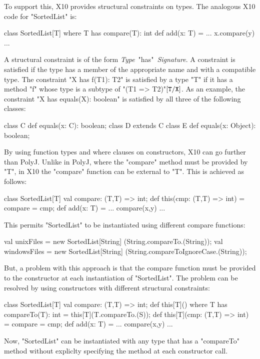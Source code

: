 \documentclass[preprint,nocopyrightspace,9pt]{sigplanconf}
\begin{document}
To support this, X10 provides structural constraints on types.
The analogous X10 code for \xcd"SortedList" is:
\begin{xten}
class SortedList[T] where T has compare(T): int {
    def add(x: T) = { ... x.compare(y) ... }
}
\end{xten}

A structural constraint is of the form \emph{Type}~\xcd"has"~\emph{Signature}.
A constraint is satisfied if the type has a member of the appropriate name
and with a compatible type.
The constraint \xcd"X has f(T1): T2"
is satisfied by a type \xcd"T" if it has a method \xcd"f"
whose type is a subtype of \xcd"(T1 => T2)"$[{\tt T}/{\tt X}]$.
As an example,
the constraint \xcd"X has equals(X): boolean"
is satisfied by all three of the following classes:
\begin{xten}
class C { def equals(x: C): boolean; }
class D extends C { }
class E { def equals(x: Object): boolean; }
\end{xten}

By using function types and where clauses on constructors,
X10 can go further than PolyJ.
Unlike in PolyJ, where the \xcd"compare" method must be provided by \xcd"T",
in X10 the \xcd"compare" function can be external to \xcd"T".
This is achieved as follows:
\begin{xten}
class SortedList[T] {
    val compare: (T,T) => int;
    def this(cmp: (T,T) => int) = { compare = cmp; }
    def add(x: T) = { ... compare(x,y) ... }
}
\end{xten}

This permits
\xcd"SortedList" to be instantiated using different compare functions:
\begin{xten}
val unixFiles    = new SortedList[String]
                        (String.compareTo.(String));
val windowsFiles = new SortedList[String]
                        (String.compareToIgnoreCase.(String));
\end{xten}

But, a problem with this approach is that the compare function must be
provided to the constructor at each instantiation of \xcd"SortedList".
The problem can be resolved by using constructors with different
structural constraints:
\begin{xten}
class SortedList[T] {
    val compare: (T,T) => int;
    def this[T]() where T has compareTo(T): int = {
        this[T](T.compareTo.(S));
    }
    def this[T](cmp: (T,T) => int) = { compare = cmp; }
    def add(x: T) = { ... compare(x,y) ... }
}
\end{xten}
Now, \xcd"SortedList" can be instantiated with any type that has
a \xcd"compareTo"
method without expliclty specifying the method at each constructor call.
\end{document}
